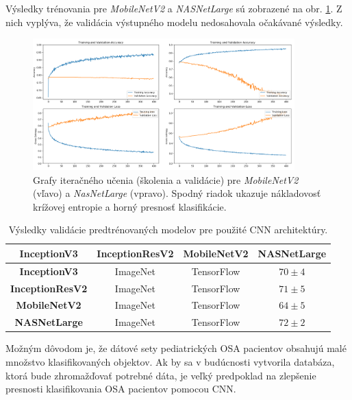 Výsledky trénovania pre \textit{MobileNetV2} a \textit{NASNetLarge} sú zobrazené na obr. \ref{fig:resers:d}. Z nich vyplýva, že validácia výstupného modelu nedosahovala očakávané výsledky. 


\begin{figure}[h]
	\centering
	\includegraphics[width=0.9\textwidth]{figures/resers_d.png}
	\caption{Grafy iteračného učenia (školenia a validácie) pre \textit{MobileNetV2} (vľavo) a \textit{NasNetLarge} (vpravo). Spodný riadok ukazuje nákladovosť krížovej entropie a horný presnosť klasifikácie.}
	\label{fig:resers:d}
\end{figure}


\begin{table}[H]
	\caption{\label{tab:resers:1} Výsledky validácie predtrénovaných modelov pre použité CNN architektúry. }
	\centering
	\begin{tabular}{cccc}
		\toprule
		\textbf{InceptionV3} & \textbf{InceptionResV2} & \textbf{MobileNetV2} & \textbf{NASNetLarge}     \\ 
		\midrule
		\textbf{InceptionV3}           & ImageNet     	& TensorFlow    & $70 \pm 4$		\\ 
		\textbf{InceptionResV2}        & ImageNet		& TensorFlow  	& $71 \pm 5$		\\ 
		\textbf{MobileNetV2}           & ImageNet     	& TensorFlow    & $64 \pm 5$		\\ 
		\textbf{NASNetLarge}           & ImageNet     	& TensorFlow    & $72 \pm 2$		\\ 
		\bottomrule
	\end{tabular}
\end{table}

Možným dôvodom je, že dátové sety pediatrických OSA pacientov obsahujú malé množstvo klasifikovaných objektov. Ak by sa v budúcnosti vytvorila databáza, ktorá bude zhromažďovať potrebné dáta, je veľký predpoklad na zlepšenie presnosti klasifikovania OSA pacientov pomocou CNN.


